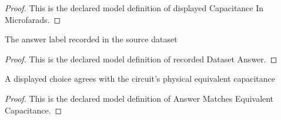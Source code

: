 \begin{proof}
  This is the declared model definition of displayed Capacitance In Microfarads.
\end{proof}
\begin{definition}
  \label{def:physics:phyx-mini-0877:phyxminiproblems-problemphyxmini0877-recordeddatasetanswer}
  The answer label recorded in the source dataset
\end{definition}
\begin{proof}
  This is the declared model definition of recorded Dataset Answer.
\end{proof}
\begin{definition}
  \label{def:physics:phyx-mini-0877:phyxminiproblems-problemphyxmini0877-answermatchesequivalentcapacitance}
  A displayed choice agrees with the circuit's physical equivalent capacitance
\end{definition}
\begin{proof}
  This is the declared model definition of Answer Matches Equivalent Capacitance.
\end{proof}
